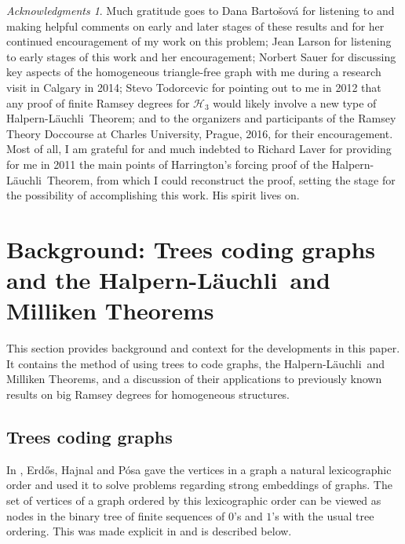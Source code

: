 \documentclass{amsart}
\theoremstyle{remark}
\theoremstyle{definition}
\theoremstyle{remark}
\newtheorem*{ack}{Acknowledgments}
\newcommand{\Erdos}{Erd{\H{o}}s}
\newcommand{\Lauchli}{L{\"{a}}uchli}
\begin{document}
\begin{ack}
Much gratitude goes to
 Dana Barto\v{s}ov\'a for listening to and making helpful comments on early and later stages of these results and for her continued encouragement of my work on this problem;
 Jean Larson for listening to early stages of this work and her encouragement;
Norbert Sauer for discussing key aspects of the homogeneous triangle-free graph with me during a research visit in Calgary in 2014;    Stevo Todorcevic for pointing out to me in 2012 that any proof of finite Ramsey degrees for $\mathcal{H}_3$ would likely involve a new type of Halpern-\Lauchli\ Theorem;
 and to the organizers and participants of the
Ramsey Theory Doccourse at Charles University, Prague, 2016, for their encouragement.
Most of all,  I am grateful for  and much indebted to
  Richard Laver  for
providing  for me in 2011 the main  points of
 Harrington's forcing proof of the Halpern-\Lauchli\ Theorem, from which I could reconstruct the proof,
setting the stage for the possibility of accomplishing this work.  His spirit lives on.
\end{ack}








\section{Background: Trees coding graphs and the Halpern-\Lauchli\ and  Milliken Theorems}\label{sec.2}


This section
 provides background and context for  the developments in this paper.
It contains the method of using trees to code graphs, the Halpern-\Lauchli\ and Milliken Theorems,
and a discussion of  their applications to
previously known results on
 big Ramsey degrees
for homogeneous structures.





\subsection{Trees coding graphs}\label{subsection.treescodinggraphs}


In \cite{Erdos/Hajnal/Posa75},
\Erdos, Hajnal and P\'{o}sa
gave the vertices in a graph a natural lexicographic order
 and used it to solve problems regarding strong embeddings of graphs.
The set of  vertices of a graph ordered by this lexicographic order can be
viewed as nodes in
the  binary tree of finite sequences of $0$'s and $1$'s
with
 the usual tree ordering.
This   was made explicit  in \cite{Sauer98} and is described  below.
\end{document}
